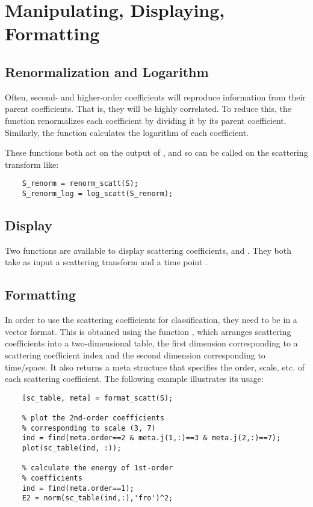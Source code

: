 \documentclass[twocolumn]{article}
\begin{document}
\section{Manipulating, Displaying, Formatting}

\subsection{Renormalization and Logarithm}
Often, second- and higher-order coefficients will reproduce information from their parent coefficients. That is, they will be highly correlated. To reduce this, the  function renormalizes each coefficient by dividing it by its parent coefficient. Similarly, the  function calculates the logarithm of each coefficient.

These functions both act on the output of , and so can be called on the scattering transform  like:
\begin{lstlisting}
	S_renorm = renorm_scatt(S);
	S_renorm_log = log_scatt(S_renorm);
\end{lstlisting}

\subsection{Display}
Two functions are available to display scattering coefficients,  and . They both take as input a scattering transform  and a time point .

\subsection{Formatting}
In order to use the scattering coefficients for classification, they need to be in a vector format. This is obtained using the function , which arranges scattering coefficients into a two-dimensional table, the first dimension corresponding to a scattering coefficient index and the second dimension corresponding to time/space. It also returns a meta structure that specifies the order, scale, etc. of each scattering coefficient. The following example illustrates its usage:
\begin{lstlisting}
	[sc_table, meta] = format_scatt(S);
	
	% plot the 2nd-order coefficients
	% corresponding to scale (3, 7)
	ind = find(meta.order==2 & meta.j(1,:)==3 & meta.j(2,:)==7);
	plot(sc_table(ind, :));
	
	% calculate the energy of 1st-order
	% coefficients
	ind = find(meta.order==1);
	E2 = norm(sc_table(ind,:),'fro')^2;
\end{lstlisting}
\end{document}
